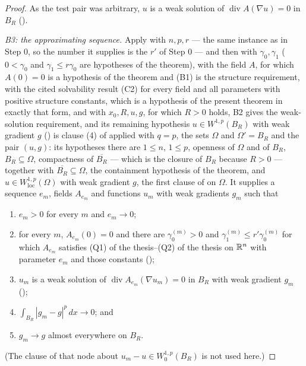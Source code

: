 \begin{proof}
As the test pair was arbitrary, $u$ is a weak solution of
$\operatorname{div}A(\nabla u)=0$ in $B_R$ ().

\emph{B3: the approximating sequence.}  Apply
 with $n,p,r$ --- the same instance as in
Step 0, so the number it supplies is the $r'$ of Step 0 --- and then with
$\gamma_0,\gamma_1$ ($0<\gamma_0$ and $\gamma_1\le r\gamma_0$ are hypotheses of
the theorem), with the field $A$, for which $A(0)=0$ is a hypothesis of the
theorem and (B1) is the structure requirement, with the cited solvability result
(C2) for every field and all parameters with positive structure constants, which
is a hypothesis of the present theorem in exactly that form, and with
$x_0,R,u,g$, for which $R>0$ holds, B2 gives the weak-solution requirement, and
its remaining hypothesis $u\in W^{1,p}(B_R)$ with weak gradient $g$
() is clause (4) of  applied
with $q=p$, the sets $\Omega$ and $\Omega'=B_R$ and the pair $(u,g)$: its
hypotheses there are $1\le n$, $1\le p$, openness of $\Omega$ and of $B_R$,
$B_R\subseteq\Omega$, compactness of $\overline{B_R}$ --- which is the closure of
$B_R$ because $R>0$ --- together with $\overline{B_R}\subseteq\Omega$, the
containment hypothesis of the theorem, and
$u\in W^{1,p}_{\mathrm{loc}}(\Omega)$ with weak gradient $g$, the first clause of
 on $\Omega$.  It
supplies a sequence $e_m$, fields $A_{e_m}$ and functions $u_m$ with weak
gradients $g_m$ such that
\begin{enumerate}
\item $e_m>0$ for every $m$ and $e_m\to0$;
\item for every $m$, $A_{e_m}(0)=0$ and there are $\gamma_0^{(m)}>0$ and
  $\gamma_1^{(m)}\le r'\gamma_0^{(m)}$ for which $A_{e_m}$ satisfies
  (Q1) of the thesis--(Q2) of the thesis on $\mathbb{R}^n$ with parameter $e_m$ and those
  constants ();
\item $u_m$ is a weak solution of $\operatorname{div}A_{e_m}(\nabla u_m)=0$ in
  $B_R$ with weak gradient $g_m$ ();
\item $\int_{B_R}|g_m-g|^p\,dx\to0$; and
\item $g_m\to g$ almost everywhere on $B_R$.
\end{enumerate}
(The clause of that node about $u_m-u\in W^{1,p}_0(B_R)$ is not used here.)


\end{proof}
